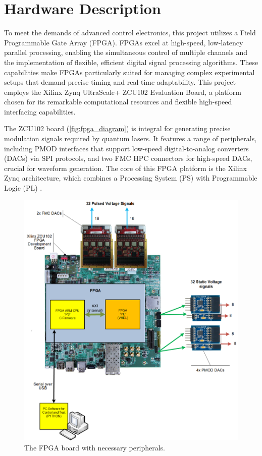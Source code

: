 \section{Hardware Description}
To meet the demands of advanced control electronics, this project utilizes a Field Programmable Gate Array (FPGA). FPGAs excel at high-speed, low-latency parallel processing, enabling the simultaneous control of multiple channels and the implementation of flexible, efficient digital signal processing algorithms. These capabilities make FPGAs particularly suited for managing complex experimental setups that demand precise timing and real-time adaptability. This project employs the Xilinx Zynq UltraScale+ ZCU102 Evaluation Board, a platform chosen for its remarkable computational resources and flexible high-speed interfacing capabilities.

The ZCU102 board (\autoref{fig:fpga_diagram}) is integral for generating precise modulation signals required by quantum lasers. It features a range of peripherals, including PMOD interfaces that support low-speed digital-to-analog converters (DACs) via SPI protocols, and two FMC HPC connectors for high-speed DACs, crucial for waveform generation. The core of this FPGA platform is the Xilinx Zynq architecture, which combines a Processing System (PS) with Programmable Logic (PL) \cite{XilinxUG1182}.

\begin{figure}[ht]
    \centering
    \includegraphics[width=0.80\linewidth]{figures/board.png}
    \caption{The FPGA board with necessary peripherals.}
    \label{fig:fpga_diagram}
\end{figure}

